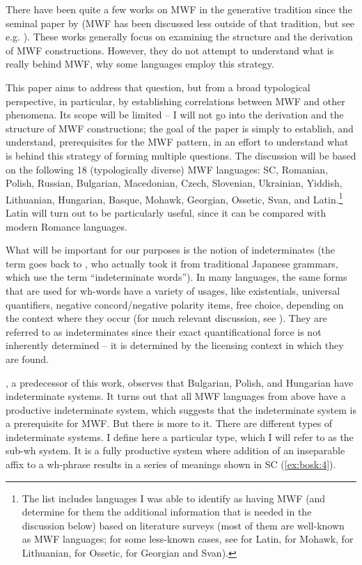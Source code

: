 \documentclass[output=paper,colorlinks,citecolor=brown]{langscibook}
\begin{document}
\noindent There have been quite a few works on MWF in the generative tradition since the seminal paper by \citet{bos:Rudin1988} (MWF has been discussed less outside of that tradition, but see e.g. \citealt{Mycock2007}). These works generally focus on examining the structure and the derivation of MWF constructions. However, they do not attempt to understand what is really behind MWF, why some languages employ this strategy.

This paper aims to address that question, but from a broad typological perspective, in particular, by establishing correlations between MWF and other phenomena. Its scope will be limited -- I will not go into the derivation and the structure of MWF constructions; the goal of the paper is simply to establish, and understand, prerequisites for the MWF pattern, in an effort to understand what is behind this strategy of forming multiple questions. The discussion will be based on the following 18 (typologically diverse) MWF languages: SC, Romanian, Polish, Russian, Bulgarian, Macedonian, Czech, Slovenian, Ukrainian, Yiddish, Lithuanian, Hungarian, Basque, Mohawk, Georgian, Ossetic, Svan, and Latin.\footnote{The list includes languages I was able to identify as having MWF (and determine for them the additional information that is needed in the discussion below) based on literature surveys (most of them are well-known as MWF languages; for some less-known cases, see \citealt{Ledgeway2012} for Latin, \citealt{Baker1996} for Mohawk, \citealt{GillonArmoskaite2015} for Lithuanian, \citealt{Erschler2012} for Ossetic, \citealt{Erschler2015} for Georgian and Svan).} Latin will turn out to be particularly useful, since it can be compared with modern Romance languages.

What will be important for our purposes is the notion of indeterminates (the term goes back to \citealt{Kuroda1965}, who actually took it from traditional Japanese grammars, which use the term ``indeterminate words''). In many languages, the same forms that are used for wh-words have a variety of usages, like existentials, universal quantifiers, negative concord/negative polarity items, free choice, depending on the context where they occur (for much relevant discussion, see \citealt{Haspelmath1997}). They are referred to as indeterminates since their exact quantificational force is not inherently determined -- it is determined by the licensing context in which they are found.

\citet{Cheng1991}, a predecessor of this work, observes that Bulgarian, Polish, and Hungarian have indeterminate systems. It turns out that all MWF languages from above have a productive indeterminate system, which suggests that the indeterminate system is a prerequisite for MWF. But there is more to it. There are different types of indeterminate systems. I define here a particular type, which I will refer to as the sub-wh system. It is a fully productive system where addition of an inseparable affix to a wh-phrase results in a series of meanings shown in SC (\ref{ex:bosk:4}).
\end{document}

